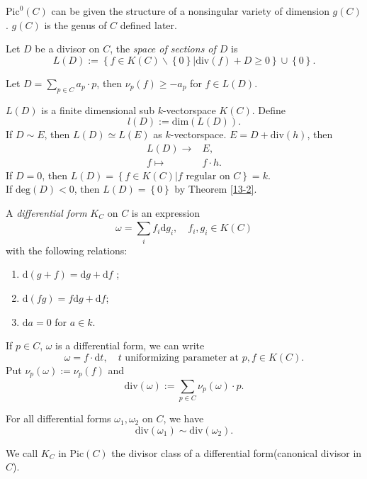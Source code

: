 \begin{theorem}
  $\mathrm{Pic}^0(C)$ can be given the structure of a nonsingular variety of dimension $g(C)$. $g(C)$ is the genus of $C$ defined later.
\end{theorem}

\begin{definition}
  Let $D$ be a divisor on $C$, the \textit{space of sections of $D$ } is 
  \[
    L(D):=\left\{f\in K(C)\backslash  \left\{0\right\}  | \mathrm{div}(f)+D\ge 0\right\} \cup \left\{0\right\} .
  \] 
\end{definition}
Let $D=\sum_{p \in C}^{} a_p \cdot p$, then $\nu_p(f)\ge -a_p$ for $f \in L(D)$.

$L(D)$ is a finite dimensional sub $k$-vectorspace $K(C)$. Define
\[
  l(D):=\mathrm{dim}\left( L(D) \right) .
\] 
If $D\sim E$, then $L(D)\simeq L(E)$ as $k$-vectorspace. $E=D+\mathrm{div}(h)$, then 
\begin{align*}
  L(D)\to &E,\\
  f\mapsto & f\cdot h
.\end{align*}
If $D=0$, then $L(D)=\left\{f\in K(C)|f \text{ regular on }C\right\} = k$.\\
If $\mathrm{deg}(D)<0$, then $L(D)=\left\{0\right\} $ by Theorem \ref{13-2}.


\begin{definition}
  A \textit{differential form} $K_C$ on $C$ is an expression 
   \[
     \omega=\sum_{i}^{} f_i \mathrm{d}g_i,\quad f_i,g_i \in K(C)
   \] 
   with the following relations:
   \begin{enumerate}
     \item $\mathrm{d}(g+f)=\mathrm{d}g+\mathrm{d}f$ ;
     \item $\mathrm{d}(fg)=f\mathrm{d}g+\mathrm{d}f$;
     \item $\mathrm{d}a=0$ for $a\in k$.
   \end{enumerate}
\end{definition}

If $p \in C$, $\omega$ is a differential form, we can write
\[
  \omega=f\cdot \mathrm{d}t,\quad t  \text{ uniformizing parameter at }p, f \in K(C).
\] 
Put $\nu_p(\omega):=\nu_p(f)$ and 
\[
  \mathrm{div}(\omega):=\sum_{p \in C}^{} \nu_p(\omega)\cdot p.
\] 
\begin{theorem}
  For all differential forms $\omega_1,\omega_2$ on $C$, we have
  \[
    \mathrm{div}\left( \omega_1 \right) \sim \mathrm{div}\left( \omega_2 \right) .
  \] 
\end{theorem}
We call $K_C$ in $\mathrm{Pic}(C)$ the divisor class of a differential form(canonical divisor in $C$).

